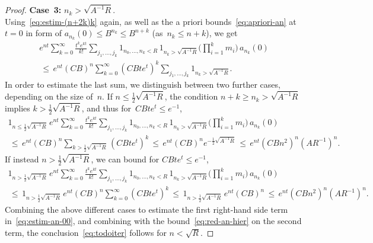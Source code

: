 \documentclass[10pt,a4paper]{amsart}
\begin{document}
\begin{proof}
\medskip\noindent
{\bf Case~3:} $n_k>\sqrt{A^{-1}R}$.\\
Using~\eqref{eq:estim-(n+2k)k} again, as well as the a priori bounds~\eqref{eq:apriori-an} at $t=0$ in form of $a_{n_k}(0)\le B^{n_k}\le B^{n+k}$ (as~$n_k\le n+k$), we get
\begin{multline}
e^{nt}\sum_{k=0}^\infty \tfrac{t^ke^{kt}}{k!}\sum_{j_1,\ldots,j_k}1_{n_0,\ldots,n_k<R}\,1_{n_k>\sqrt{A^{-1}R}}\Big(\prod_{i=1}^km_i\Big)\,a_{n_k}(0)\\[-3mm]
\,\le\,e^{nt}(CB)^n\sum_{k=0}^\infty (CBte^{t})^k\sum_{j_1,\ldots,j_k}1_{n_k>\sqrt{A^{-1}R}}.
\end{multline}
In order to estimate the last sum, we distinguish between two further cases, depending on the size of~$n$. If $n\le\frac12\sqrt{A^{-1}R}$, the condition $n+k\ge n_k> \sqrt{A^{-1}R}$ implies $k> \frac12\sqrt{A^{-1}R}$, and thus for~$CBte^{t}\le e^{-1}$,
\begin{multline}
1_{n\le \frac12\sqrt{A^{-1}R}}\,e^{nt}\sum_{k=0}^\infty \tfrac{t^ke^{kt}}{k!} \sum_{j_1,\ldots,j_k} 1_{n_0,\ldots,n_k<R}\,1_{n_k> \sqrt{A^{-1}R}}\Big(\prod_{i=1}^km_i\Big)\,a_{n_k}(0)\\
\,\le\,e^{nt}(CB)^n\sum_{k>\frac12\sqrt{A^{-1}R}}(CBte^t)^k
\,\le\,e^{nt}(CB)^ne^{-\frac12\sqrt{A^{-1}R}}
\,\le\,e^{nt}(CBn^2)^n(AR^{-1})^n.
\end{multline}
If instead $n>\frac12\sqrt{A^{-1}R}$, we can bound for $CBte^t\le e^{-1}$,
\begin{multline}
1_{n>\frac12\sqrt{A^{-1}R}}\,e^{nt}\sum_{k=0}^\infty \tfrac{t^ke^{kt}}{k!}\sum_{j_1,\ldots,j_k}1_{n_0,\ldots,n_k<R}\,1_{n_k> \sqrt{A^{-1}R}}\Big(\prod_{i=1}^km_i\Big)\,a_{n_k}(0)\\
\,\le\,1_{n>\frac12\sqrt{A^{-1}R}}\,e^{nt}(CB)^n\sum_{k=0}^\infty (CBte^{t})^k
\,\le\,1_{n> \frac12\sqrt{A^{-1}R}}\,e^{nt}(CB)^n
\,\le\,e^{nt}(CBn^2)^n(AR^{-1})^{n}.
\end{multline}
Combining the above different cases to estimate the first right-hand side term in~\eqref{eq:estim-an-00}, and combining with the bound~\eqref{eq:red-an-hier} on the second term, the conclusion~\eqref{eq:todoiter} follows for $n<\sqrt R$.
\end{proof}
\end{document}
